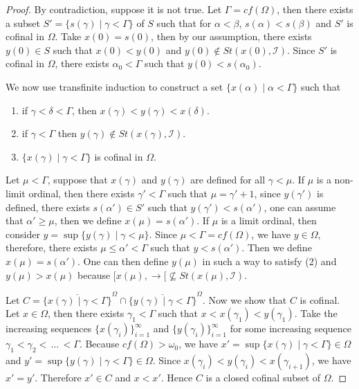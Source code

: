 \documentclass[12pt,oneside,english]{amsbook}
\numberwithin{equation}{section} %
\numberwithin{figure}{section} %
\theoremstyle{plain}
\numberwithin{section}{chapter}
\theoremstyle{plain}
\begin{document}
\begin{proof}
  By contradiction, suppose it is not true. Let $\Gamma = cf(\Omega)$, then there exists a subset $S' = \{ s(\gamma) \; | \; \gamma < \Gamma \}$ of $S$ such that for $\alpha < \beta$, $s(\alpha) < s(\beta)$ and $S'$ is cofinal in $\Omega$. Take $x(0) = s(0)$, then by our assumption, there exists $y(0) \in S$ such that $x(0) < y(0)$ and $y(0) \notin St(x(0), \mathcal{I})$. Since $S'$ is cofinal in $\Omega$, there exists $\alpha_0 < \Gamma$ such that $y(0) < s(\alpha_0)$.

  We now use transfinite induction to construct a set $\{x(\alpha) \; | \; \alpha < \Gamma\}$ such that
  \begin{enumerate}
  \item if $\gamma < \delta < \Gamma$, then $x(\gamma) < y(\gamma) < x(\delta)$.
  \item if $\gamma < \Gamma$ then $y(\gamma) \notin St(x(\gamma),\mathcal{I})$.
  \item $\{x(\gamma) \; | \; \gamma < \Gamma \}$ is cofinal in $\Omega$.
  \end{enumerate}
  Let $\mu < \Gamma$, suppose that $x(\gamma)$ and $y(\gamma)$ are defined
  for all $\gamma < \mu$. If $\mu$ is a non-limit ordinal, then there exists $\gamma' < \Gamma$ such that $\mu = \gamma' + 1$, since $y(\gamma')$ is defined, there exists $s(\alpha') \in S'$ such that $y(\gamma') < s(\alpha')$, one can assume that $\alpha' \geq \mu$, then we define $x(\mu) = s(\alpha')$. If $\mu$ is a limit ordinal, then consider $y = \sup{\{y(\gamma) \; | \; \gamma < \mu\}}$. Since $\mu < \Gamma = cf(\Omega)$, we have $y \in \Omega$, therefore, there exists $\mu \leq \alpha' < \Gamma$ such that $y < s(\alpha')$. Then we define $x(\mu) = s(\alpha')$. One can then define $y(\mu)$ in such a way to satisfy (2) and $y(\mu) > x(\mu)$ because $[x(\mu), \rightarrow[ \nsubseteq St(x(\mu),\mathcal{I})$.
  
  Let $C =  \overline{\{x(\gamma) \; | \; \gamma < \Gamma \}}^{\Omega} \cap  \overline{\{y(\gamma) \; | \; \gamma < \Gamma \}}^{\Omega}$. Now we show that $C$ is cofinal. Let $x \in \Omega$, then there exists $\gamma_1 < \Gamma$ such that $x < x(\gamma_1) < y(\gamma_1)$. Take the increasing sequences $\{x(\gamma_i)\}_{i = 1}^{\infty}$ and $\{y(\gamma_i)\}_{i = 1}^{\infty}$ for some increasing sequence $\gamma_1 < \gamma_2 < \, \ldots \, < \Gamma$. Because $cf(\Omega) > \omega_0$, we have $x' = \sup{\{x(\gamma) \; | \; \gamma < \Gamma \}} \in \Omega$ and $y' = \sup{\{y(\gamma) \; | \; \gamma < \Gamma \}} \in \Omega$. Since $x(\gamma_i) < y(\gamma_i) < x(\gamma_{i + 1})$, we have $x' = y'$. Therefore $x' \in C$ and $x < x'$. Hence $C$ is a closed cofinal subset of $\Omega$.   
  

\end{proof}
\end{document}
